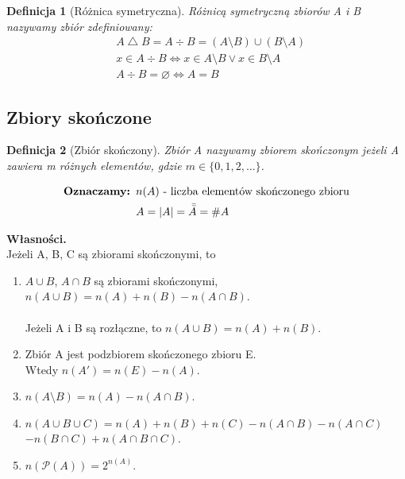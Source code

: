 \documentclass[a5paper,8pt]{article}
\theoremstyle{mythmstyle}
\newtheorem{definition}{Definicja}[section]
\newcommand\tab[1][1cm]{\hspace*{#1}}
\begin{document}
        \begin{definition}[Różnica symetryczna]
            Różnicą symetryczną zbiorów A i B nazywamy zbiór zdefiniowany:
            \begin{align*}
                & A \bigtriangleup B = A \div B = ( A \setminus B ) \cup ( B \setminus A ) \\
                & x \in A \div B \iff x \in A \setminus B \vee x \in B \setminus A \\
                & A \div B = \varnothing \iff A = B
            \end{align*}
        \end{definition}


        \subsection{Zbiory skończone} %
        \label{sub:zbiory_skończone}
            
        \begin{definition}[Zbiór skończony]
            Zbiór A nazywamy zbiorem skończonym jeżeli A zawiera m różnych elementów, gdzie $ m \in \{ 0, 1, 2, \ldots \} $.
        \end{definition}
        \begin{align*}
            \text{\textbf{Oznaczamy: }} & n(A) \text{ - liczba elementów skończonego zbioru} \\
            & A = |A| = \bar{\bar{A}} = \#A
        \end{align*}

        \textbf{Własności.} \\
        Jeżeli A, B, C są zbiorami skończonymi, to

        \begin{enumerate}
            \item $ A \cup B $, $ A \cap B $ są zbiorami skończonymi, \\
                  $ n(A \cup B) = n(A) + n(B) - n(A \cap B) $.\\\\
                  Jeżeli A i B są rozłączne, to $ n(A \cup B) = n(A) + n(B) $.
            \item Zbiór A jest podzbiorem skończonego zbioru E. \\
                  Wtedy $ n(A') = n(E) - n(A) $.
            \item $ n(A \setminus B) = n(A) - n(A \cap B) $.
            \item $ n(A \cup B \cup C) = n(A) + n(B) + n(C) - n(A \cap B) - n(A \cap C) $ \\ \tab\tab $ - n(B \cap C) + n(A \cap B \cap C) $.
            \item $ n(\mathcal{P}(A)) = 2^{n(A)} $.

        \end{enumerate}
\end{document}
